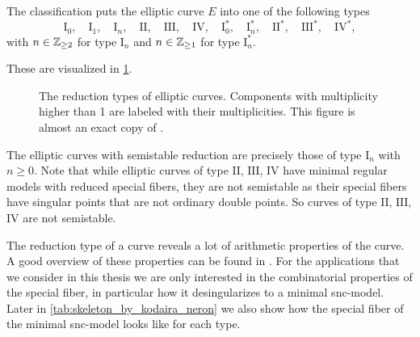 The classification puts the elliptic curve $E$ into one of the following types 
\[
	\mathrm{I}_0,\quad \mathrm{I}_1,\quad \mathrm{I}_n,\quad \mathrm{II},\quad \mathrm{III},\quad \mathrm{IV},\quad \mathrm{I}_0^*,\quad \mathrm{I}_{n}^*,\quad \mathrm{II}^*,\quad \mathrm{III}^*, \quad \mathrm{IV}^*
,\]
with $n \in \mathbb{Z}_{\ge 2}$ for type $\mathrm I_n$ and $n \in \mathbb{Z}_{\ge 1}$ for type $\mathrm I_n^*$. 

These are visualized in \cref{fig:reduction_types_of_e}. 

\begin{figure}[hbtp]
    \centering
    \caption{The reduction types of elliptic curves. Components with multiplicity higher than 1 are labeled with their multiplicities. This figure is almost an exact copy of \cite[fig.\ 4.4]{silvermanAdvancedTopicsArithmetic1994}.}
    \label{fig:reduction_types_of_e}
\end{figure}

The elliptic curves with semistable reduction are precisely those of type $\mathrm I_n$ with $n \ge 0$. 
Note that while elliptic curves of type  $\mathrm{II}$, $\mathrm{III}$, $\mathrm{IV}$ have minimal regular models with reduced special fibers, they are not semistable as their special fibers have singular points that are not ordinary double points. 
So curves of type  $\mathrm{II}$, $\mathrm{III}$, $\mathrm{IV}$ are not semistable. 

The reduction type of a curve reveals a lot of arithmetic properties of the curve. 
A good overview of these properties can be found in \cite[tab.\ 4.1, p.\ 365]{silvermanAdvancedTopicsArithmetic1994}.
For the applications that we consider in this thesis we are only interested in the combinatorial properties of the special fiber, in particular how it desingularizes to a minimal snc-model. 
Later in \cref{tab:skeleton_by_kodaira_neron} we also show how the special fiber of the minimal snc-model looks like for each type. 
